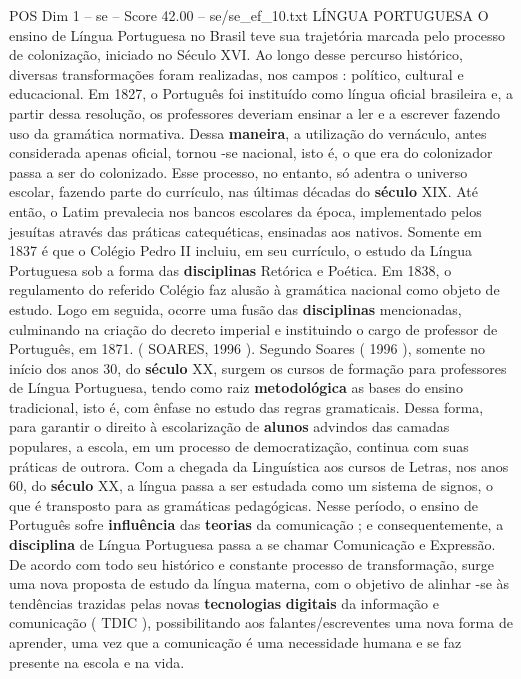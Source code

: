 \begin{textsample}{POS Dim 1 – se – Score 42.00 – se/se\_ef\_10.txt}  \label{ex:f1_pos_086}
LÍNGUA PORTUGUESA O ensino de Língua Portuguesa no Brasil teve sua trajetória marcada pelo processo de colonização, iniciado no Século XVI.
Ao longo desse percurso histórico, diversas transformações foram realizadas, nos campos : político, cultural e educacional.
Em 1827, o Português foi instituído como língua oficial brasileira e, a partir dessa resolução, os professores deveriam ensinar a ler e a escrever fazendo uso da gramática normativa.
Dessa \textbf{maneira}, a utilização do vernáculo, antes considerada apenas oficial, tornou -se nacional, isto é, o que era do colonizador passa a ser do colonizado.
Esse processo, no entanto, só adentra o universo escolar, fazendo parte do currículo, nas últimas décadas do \textbf{século} XIX.
Até então, o Latim prevalecia nos bancos escolares da época, implementado pelos jesuítas através das práticas catequéticas, ensinadas aos nativos.
Somente em 1837 é que o Colégio Pedro II incluiu, em seu currículo, o estudo da Língua Portuguesa sob a forma das \textbf{disciplinas} Retórica e Poética.
Em 1838, o regulamento do referido Colégio faz alusão à gramática nacional como objeto de estudo.
Logo em seguida, ocorre uma fusão das \textbf{disciplinas} mencionadas, culminando na criação do decreto imperial e instituindo o cargo de professor de Português, em 1871. ( SOARES, 1996 ).
Segundo Soares ( 1996 ), somente no início dos anos 30, do \textbf{século} XX, surgem os cursos de formação para professores de Língua Portuguesa, tendo como raiz \textbf{metodológica} as bases do ensino tradicional, isto é, com ênfase no estudo das regras gramaticais.
Dessa forma, para garantir o direito à escolarização de \textbf{alunos} advindos das camadas populares, a escola, em um processo de democratização, continua com suas práticas de outrora.
Com a chegada da Linguística aos cursos de Letras, nos anos 60, do \textbf{século} XX, a língua passa a ser estudada como um sistema de signos, o que é transposto para as gramáticas pedagógicas.
Nesse período, o ensino de Português sofre \textbf{influência} das \textbf{teorias} da comunicação ; e consequentemente, a \textbf{disciplina} de Língua Portuguesa passa a se chamar Comunicação e Expressão.
De acordo com todo seu histórico e constante processo de transformação, surge uma nova proposta de estudo da língua materna, com o objetivo de alinhar -se às tendências trazidas pelas novas \textbf{tecnologias} \textbf{digitais} da informação e comunicação ( TDIC ), possibilitando aos falantes/escreventes uma nova forma de aprender, uma vez que a comunicação é uma necessidade humana e se faz presente na escola e na vida.

\end{textsample}
